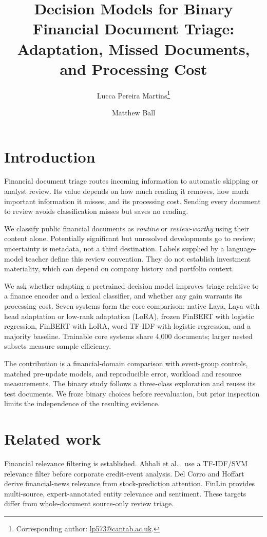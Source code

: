 \documentclass[11pt,a4paper]{article}
\title{Decision Models for Binary Financial Document Triage:\\
Adaptation, Missed Documents, and Processing Cost}
\author{Lucca Pereira Martins\thanks{Corresponding author:
 \href{mailto:lp573@cantab.ac.uk}{lp573@cantab.ac.uk}.} \and Matthew Ball}
\date{}
\begin{document}
\maketitle
\begin{abstract}

\end{abstract}

\section{Introduction}
Financial document triage routes incoming information to automatic skipping or
analyst review. Its value depends on how much reading it removes, how much
important information it misses, and its processing cost. Sending every document
to review avoids classification misses but saves no reading.

We classify public financial documents as \emph{routine} or \emph{review-worthy}
using their content alone. Potentially significant but unresolved developments
go to review; uncertainty is metadata, not a third destination. Labels supplied
by a language-model teacher define this review convention. They do not establish
investment materiality, which can depend on company history and portfolio context.

We ask whether adapting a pretrained decision model improves triage relative to
a finance encoder and a lexical classifier, and whether any gain warrants its
processing cost. Seven systems form the core comparison: native Laya, Laya with
head adaptation or low-rank adaptation (LoRA), frozen FinBERT with logistic
regression, FinBERT with LoRA, word TF-IDF with logistic regression, and a majority
baseline. Trainable core systems share 4,000 documents; larger nested subsets
measure sample efficiency.

The contribution is a financial-domain comparison with event-group controls,
matched pre-update models, and reproducible error, workload and resource
measurements. The binary study follows a three-class exploration and reuses its
test documents. We froze binary choices before reevaluation, but prior inspection
limits the independence of the resulting evidence.

\section{Related work}
Financial relevance filtering is established. Ahbali et al.\ \citep{credit}
use a TF-IDF/SVM relevance filter before corporate credit-event analysis.
Del Corro and Hoffart \citep{financialrelevance} derive financial-news relevance
from stock-prediction attention. FinLin \citep{finlin} provides multi-source,
expert-annotated entity relevance and sentiment. These targets differ from
whole-document source-only review triage.
\end{document}
